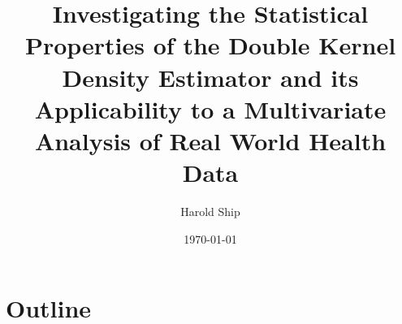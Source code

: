 \documentclass[a4paper,12pt,titlepage,oneside,openany]{book}
\title{Investigating the Statistical Properties of the Double Kernel Density Estimator and its Applicability to a Multivariate Analysis of Real World Health Data}
\author{Harold Ship}
\date{\today}
\begin{document}
\frontmatter                            %
\maketitle                              %
\tableofcontents                        %

\clearpage
\listoftables
\clearpage
\listoffigures
\clearpage
\printnomenclature
\clearpage

\mainmatter                             %

\chapter{Outline}

\end{document}
